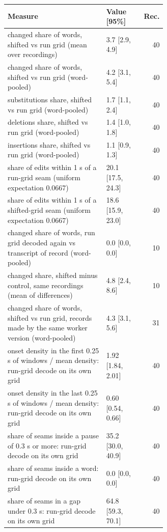 {\scriptsize\setlength{\tabcolsep}{2pt}
\begin{tabular}{@{}p{0.62\linewidth}lr@{}}
\toprule
Measure & Value [95\%] & Rec. \\
\midrule
changed share of words, shifted vs run grid (mean over recordings) & 3.7 [2.9, 4.9] & 40 \\
changed share of words, shifted vs run grid (word-pooled) & 4.2 [3.1, 5.4] & 40 \\
substitutions share, shifted vs run grid (word-pooled) & 1.7 [1.1, 2.4] & 40 \\
deletions share, shifted vs run grid (word-pooled) & 1.4 [1.0, 1.8] & 40 \\
insertions share, shifted vs run grid (word-pooled) & 1.1 [0.9, 1.3] & 40 \\
share of edits within 1 s of a run-grid seam (uniform expectation 0.0667) & 20.1 [17.5, 24.3] & 40 \\
share of edits within 1 s of a shifted-grid seam (uniform expectation 0.0667) & 18.6 [15.9, 23.0] & 40 \\
changed share of words, run grid decoded again vs transcript of record (word-pooled) & 0.0 [0.0, 0.0] & 10 \\
changed share, shifted minus control, same recordings (mean of differences) & 4.8 [2.4, 8.6] & 10 \\
changed share of words, shifted vs run grid, records made by the same worker version (word-pooled) & 4.3 [3.1, 5.6] & 31 \\
onset density in the first 0.25 s of windows / mean density: run-grid decode on its own grid & 1.92 [1.84, 2.01] & 40 \\
onset density in the last 0.25 s of windows / mean density: run-grid decode on its own grid & 0.60 [0.54, 0.66] & 40 \\
share of seams inside a pause of 0.3 s or more: run-grid decode on its own grid & 35.2 [30.0, 40.9] & 40 \\
share of seams inside a word: run-grid decode on its own grid & 0.0 [0.0, 0.0] & 40 \\
share of seams in a gap under 0.3 s: run-grid decode on its own grid & 64.8 [59.3, 70.1] & 40 \\

\end{tabular}}

